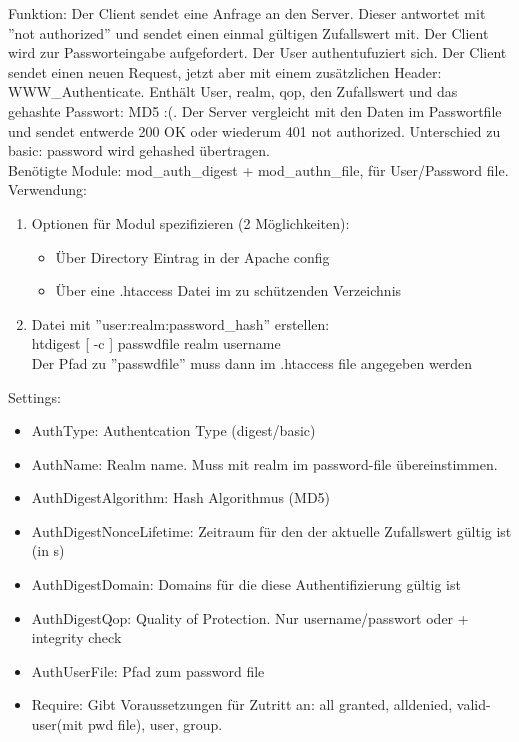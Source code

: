 \documentclass[12pt, a4paper]{report}
\begin{document}
Funktion: Der Client sendet eine Anfrage an den Server. Dieser antwortet mit ''not authorized'' und sendet einen einmal
gültigen Zufallswert mit. Der Client wird zur Passworteingabe aufgefordert. Der User authentufuziert sich.
Der Client sendet einen neuen Request, jetzt aber mit einem zusätzlichen Header: WWW\_Authenticate. Enthält
User, realm, qop, den Zufallswert und das gehashte Passwort: MD5 :(. Der Server vergleicht mit den Daten im Passwortfile
und sendet entwerde 200 OK oder wiederum 401 not authorized.
Unterschied zu basic: password wird gehashed übertragen.
\\Benötigte Module: mod\_auth\_digest + mod\_authn\_file, für User/Password file.\\
Verwendung:
\begin{enumerate}
	\item Optionen für Modul spezifizieren (2 Möglichkeiten):
	\begin{itemize}
		\item Über Directory Eintrag in der Apache config
		\item Über eine .htaccess Datei im zu schützenden Verzeichnis
	\end{itemize}
	\item Datei mit ''user:realm:password\_hash'' erstellen:\\
	htdigest [ -c ] passwdfile realm username\\
	Der Pfad zu ''passwdfile'' muss dann im .htaccess file angegeben werden
\end{enumerate}
Settings:
\begin{itemize}
	\item AuthType: Authentcation Type (digest/basic)
	\item AuthName: Realm name. Muss mit realm im password-file übereinstimmen. 
	\item AuthDigestAlgorithm: Hash Algorithmus (MD5)
	\item AuthDigestNonceLifetime: Zeitraum für den der aktuelle Zufallswert gültig ist (in s)
	\item AuthDigestDomain: Domains für die diese Authentifizierung gültig ist
	\item AuthDigestQop: Quality of Protection. Nur username/passwort oder + integrity check
	\item AuthUserFile: Pfad zum password file
	\item Require: Gibt Voraussetzungen für Zutritt an: all granted, alldenied, valid-user(mit pwd file), user, group.
\end{itemize}	
\end{document}
